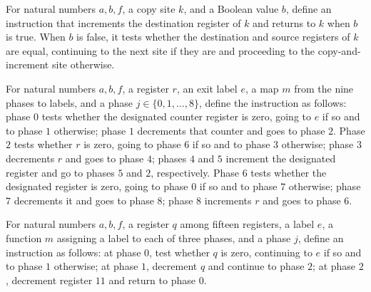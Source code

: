 \begin{definition}
\label{Complexity.PathHard.cpI}
\leanok
{}
For natural numbers $a,b,f$, a copy site $k$, and a Boolean value $b$, define an
instruction that increments the destination register of $k$ and returns to $k$ when $b$
is true. When $b$ is false, it tests whether the destination and source registers of $k$
are equal, continuing to the next site if they are and proceeding to the
copy-and-increment site otherwise.
\end{definition}

\begin{definition}
\label{Complexity.PathHard.shI}
\leanok
{}
For natural numbers $a,b,f$, a register $r$, an exit label $e$, a map $m$ from the nine
phases to labels, and a phase $j\in\{0,1,\ldots,8\}$, define the instruction as follows:
phase $0$ tests whether the designated counter register is zero, going to $e$ if so and
to phase $1$ otherwise; phase $1$ decrements that counter and goes to phase $2$. Phase
$2$ tests whether $r$ is zero, going to phase $6$ if so and to phase $3$ otherwise;
phase $3$ decrements $r$ and goes to phase $4$; phases $4$ and $5$ increment the
designated register and go to phases $5$ and $2$, respectively. Phase $6$ tests whether
the designated register is zero, going to phase $0$ if so and to phase $7$ otherwise;
phase $7$ decrements it and goes to phase $8$; phase $8$ increments $r$ and goes to
phase $6$.
\end{definition}

\begin{definition}
\label{Complexity.PathHard.sbI}
\leanok
{}
For natural numbers $a,b,f$, a register $q$ among fifteen registers, a label $e$, a
function $m$ assigning a label to each of three phases, and a phase $j$, define an
instruction as follows: at phase $0$, test whether $q$ is zero, continuing to $e$ if so
and to phase $1$ otherwise; at phase $1$, decrement $q$ and continue to phase $2$; at
phase $2$, decrement register $11$ and return to phase $0$.
\end{definition}

